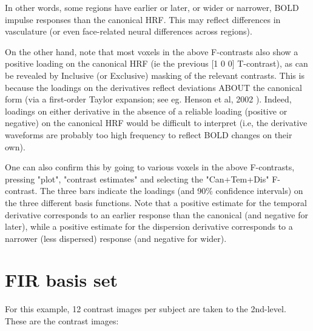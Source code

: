In other words, some regions have earlier or later, or wider or narrower, BOLD impulse responses than the canonical HRF. This may reflect differences in vasculature (or even face-related neural differences across regions).  

On the other hand, note that most voxels in the above F-contrasts also show a positive loading on the canonical HRF (ie the previous [1 0 0] T-contrast), as can be revealed by Inclusive (or Exclusive) masking of the relevant contrasts. This is because the loadings on the derivatives reflect deviations ABOUT the canonical form (via a first-order Taylor expansion; see eg. Henson et al, 2002 \cite{rnah_latency}). Indeed, loadings on either derivative in the absence of a reliable loading (positive or negative) on the canonical HRF would be difficult to interpret (i.e, the derivative waveforms are probably too high frequency to reflect BOLD changes on their own).   

One can also confirm this by going to various voxels in the above F-contrasts, pressing "plot", "contrast estimates" and selecting the "Can+Tem+Dis" F-contrast. The three bars indicate the loadings (and 90\% confidence intervals) on the three different basis functions. Note that a positive estimate for the temporal derivative corresponds to an earlier response than the canonical (and negative for later), while a positive estimate for the dispersion derivative corresponds to a narrower (less dispersed) response (and negative for wider).

\section{FIR basis set}

For this example, 12 contrast images per subject are taken to the 2nd-level. These are the contrast images:

